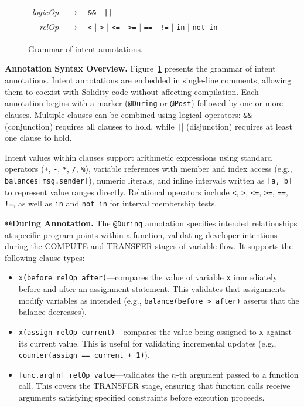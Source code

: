 \documentclass[pdflatex,sn-basic]{sn-jnl}%
\theoremstyle{thmstyleone}%
\theoremstyle{thmstyletwo}%
\theoremstyle{thmstylethree}%
\begin{document}
\begin{figure}[t]
\begin{tabular}{@{}r@{\quad}c@{\quad}l@{}}
\textit{logicOp} & $\rightarrow$ & \texttt{\&\&} $|$ \texttt{||} \\
\textit{relOp} & $\rightarrow$ & \texttt{<} $|$ \texttt{>} $|$ \texttt{<=} $|$ \texttt{>=} $|$ \texttt{==} $|$ \texttt{!=} $|$ \texttt{in} $|$ \texttt{not in} \\
\end{tabular}
\caption{Grammar of intent annotations.}
\label{fig:intent-grammar}
\end{figure}

\smallskip
\noindent\textbf{Annotation Syntax Overview.}
Figure~\ref{fig:intent-grammar} presents the grammar of intent annotations.
Intent annotations are embedded in single-line comments, allowing them to coexist with Solidity code without affecting compilation.
Each annotation begins with a marker (\texttt{@During} or \texttt{@Post}) followed by one or more clauses.
Multiple clauses can be combined using logical operators: \texttt{\&\&} (conjunction) requires all clauses to hold, while \texttt{|}| (disjunction) requires at least one clause to hold.

Intent values within clauses support arithmetic expressions using standard operators (\texttt{+}, \texttt{-}, \texttt{*}, \texttt{/}, \texttt{\%}), variable references with member and index access (e.g., \texttt{balances[msg.sender]}), numeric literals, and inline intervals written as \texttt{[a, b]} to represent value ranges directly.
Relational operators include \texttt{<}, \texttt{>}, \texttt{<=}, \texttt{>=}, \texttt{==}, \texttt{!=}, as well as \texttt{in} and \texttt{not in} for interval membership tests.

\smallskip
\noindent\textbf{@During Annotation.}
The \texttt{@During} annotation specifies intended relationships at specific program points within a function, validating developer intentions during the COMPUTE and TRANSFER stages of variable flow.
It supports the following clause types:

\begin{itemize}
    \item \texttt{x(before relOp after)}---compares the value of variable \texttt{x} immediately before and after an assignment statement. This validates that assignments modify variables as intended (e.g., \texttt{balance(before > after)} asserts that the balance decreases).

    \item \texttt{x(assign relOp current)}---compares the value being assigned to \texttt{x} against its current value. This is useful for validating incremental updates (e.g., \texttt{counter(assign == current + 1)}).

    \item \texttt{func.arg[n] relOp value}---validates the $n$-th argument passed to a function call. This covers the TRANSFER stage, ensuring that function calls receive arguments satisfying specified constraints before execution proceeds.
\end{itemize}
\end{document}
